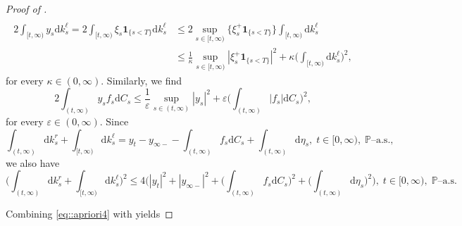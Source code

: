 \documentclass[10pt]{article} %
\def \P{\mathbb{P}}
\newcommand{\1}{\mathbf{1}}
\def\d{\mathrm{d}}
\begin{document}
\begin{proof}[Proof of ]
\begin{align}
\end{align}
\begin{align}\label{eq::cond_kell}
	2\int_{[t,\infty)} y_s\d k^\ell_s = 2\int_{[t,\infty)} \xi_s \mathbf{1}_{\{s < T\}} \d k^\ell_s &\leq 2 \sup_{s \in [t,\infty)} \big\{\xi^+_s \mathbf{1}_{\{s < T\}} \big\}\int_{[t,\infty)} \d k^\ell_s \nonumber\\
	&\leq \frac{1}{\kappa} \sup_{s \in [t,\infty)} |\xi^+_s \mathbf{1}_{\{s < T\}}|^2  + \kappa \bigg(\int_{[t,\infty)} \d k^\ell_s \bigg)^2, 
\end{align}
for every $\kappa \in (0,\infty)$. Similarly, we find
\begin{equation}\label{eq::int_y_f_cs}
	2\int_{(t,\infty)} y_s f_s  \d C_s \leq \frac{1}{\varepsilon}\sup_{s \in (t,\infty)} |y_s|^2 + \varepsilon\bigg(\int_{(t,\infty)} |f_s| \d C_s\bigg)^2,
\end{equation}
for every $\varepsilon \in (0,\infty)$. Since
\begin{equation*}
	\int_{(t,\infty)} \d k^r_s + \int_{[t,\infty)} \d k^\ell_s = y_t - y_{\infty-} - \int_{(t,\infty)} f_s \d C_s + \int_{(t,\infty)} \d \eta_s, \; t \in [0,\infty), \; \text{$\P$--a.s.},
\end{equation*}
we also have
\begin{equation}\label{eq::cond_k1}
	\bigg(\int_{(t,\infty)} \d k^r_s + \int_{[t,\infty)} \d k^\ell_s \bigg)^2 \leq 4 \bigg( |y_t|^2 + |y_{\infty-}|^2 + \bigg(\int_{(t,\infty)} f_s \d C_s\bigg)^2 + \bigg(\int_{(t,\infty)} \d \eta_s\bigg)^2 \bigg), \; t \in [0,\infty), \; \text{$\P$--a.s.}
\end{equation}

Combining \eqref{eq::apriori4} with  yields


\end{proof}
\end{document}
